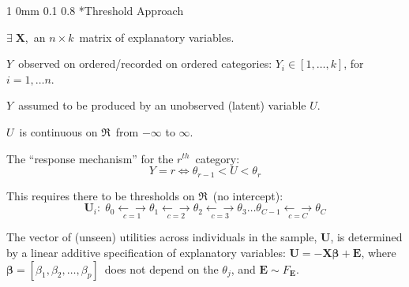 \documentclass[12pt]{article}
\makeatletter
\newcommand{\B}{\boldsymbol{\beta}}
\newcommand{\9}{\\[9pt]}
\newcommand{\U}{\mathbf{U}}
\newcommand{\X}{\mathbf{X}}
\newcommand{\E}{\mathbf{E}}
\newcommand{\bgm}{\color{MyMath}}
\newcommand{\egm}{\color{white}}
\renewenvironment{equation}{\bgm\begin{equation*}}{\end{equation*}\egm}
\renewcommand{\section}{\@startsection
	    {section}%
	    {1}%
	    {0mm}%
	    {0.1\baselineskip}%
	    {0.8\baselineskip}%
	    {\newpage \color[cmyk]{0.43,0,0.01,0} \center\LARGE}}%
\makeatother
\begin{document}
\begin{landscape}
\begin{Large}
{\section*{Threshold Approach}
\begin{ohlist}
        \item   \bgm$\exists\; \X$,\egm\ an \bgm$n \times k$\egm\ matrix of explanatory variables.
        \item   \bgm$Y$\egm\ observed on ordered/recorded on ordered categories: \bgm$Y_i \in [1,\ldots,k]$\egm, for \bgm$i=1,\ldots
                n$\egm.
        \item   \bgm$Y$\egm\ assumed to be produced by an unobserved (latent) variable \bgm$U$\egm.
        \item   \bgm$U$\egm\ is continuous on \bgm$\mathfrak{R}$\egm\ from \bgm$-\infty$ to $\infty$\egm.
        \item   The ``response mechanism'' for the \bgm$r^{th}$\egm\ category:
                \bgm\begin{equation}
                        Y=r \Longleftrightarrow \theta_{r-1} < U < \theta_r     \nonumber
                \end{equation}\egm
		        \vspace{-33pt}
        \item   This requires there to be thresholds on \bgm$\mathfrak{R}$\egm\ (no intercept):
        	    \bgm\begin{equation*}
        	    \U_i: \;
            		\theta_0 \underset{c=1}{\longleftarrow\!\longrightarrow}
            		\theta_1 \underset{c=2}{\longleftarrow\!\longrightarrow}
            		\theta_2 \underset{c=3}{\longleftarrow\!\longrightarrow}
            		\theta_3\ldots
            		\theta_{C-1} \underset{c=C}{\longleftarrow\!\longrightarrow}
            	    \theta_C        \nonumber
        	    \end{equation*}\egm
		        \vspace{-33pt}
        \item   The vector of (unseen) utilities across individuals in the sample, \bgm$\U$\egm, is determined by a linear
                additive specification of explanatory variables: \bgm$\U = -\X\B +\E$\egm, where \bgm$\B =
                [\beta_1,\beta_2,\ldots,\beta_p]$\egm\ does not depend on the \bgm$\theta_j$\egm, and \bgm$\E \sim F_{\E}$\egm.
\end{ohlist}

\newpage
}
\end{Large}
\end{landscape}
\end{document}
